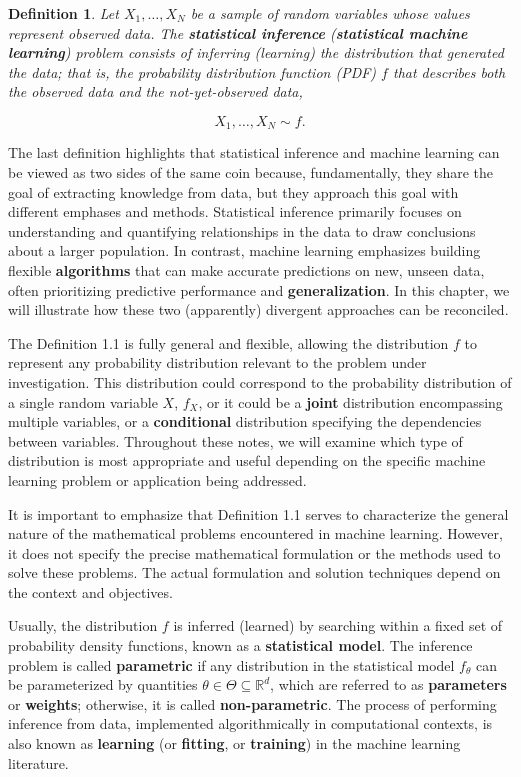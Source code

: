 \documentclass{report}
\newtheorem{definition}{Definition}[chapter]
\begin{document}
\begin{definition}
Let $X_1,\dots,X_N$ be a sample of random variables whose values represent observed data. The \textbf{statistical inference} (\textbf{statistical machine learning}) problem consists of inferring (learning) the distribution that generated the data; that is, the probability distribution function (PDF) $f$ that describes both the observed data and the not-yet-observed data,

\begin{equation*}
X_1,\dots,X_N \sim f.
\end{equation*}

\end{definition}

The last definition highlights that statistical inference and machine learning can be viewed as two sides of the same coin because, fundamentally, they share the goal of extracting knowledge from data, but they approach this goal with different emphases and methods.  Statistical inference primarily focuses on understanding and quantifying relationships in the data to draw conclusions about a larger population. In contrast, machine learning emphasizes building flexible \textbf{algorithms} that can make accurate predictions on new, unseen data, often prioritizing predictive performance and \textbf{generalization}. In this chapter, we will illustrate how these two (apparently) divergent approaches can be reconciled.

The Definition 1.1 is fully general and flexible, allowing the distribution $f$ to represent any probability distribution relevant to the problem under investigation. This distribution could correspond to the probability distribution of a single random variable $X$, $f_X$, or it could be a \textbf{joint} distribution encompassing multiple variables, or a \textbf{conditional} distribution specifying the dependencies between variables. Throughout these notes, we will examine which type of distribution is most appropriate and useful depending on the specific machine learning problem or application being addressed.

It is important to emphasize that Definition 1.1 serves to characterize the general nature of the mathematical problems encountered in machine learning. However, it does not specify the precise mathematical formulation or the methods used to solve these problems. The actual formulation and solution techniques depend on the context and objectives.

Usually, the distribution $f$ is inferred (learned) by searching within a fixed set of probability density functions, known as a \textbf{statistical model}. The inference problem is called \textbf{parametric} if any distribution in the statistical model $f_\theta$ can be parameterized by quantities $\theta \in \Theta \subseteq \mathbb{R}^d$, which are referred to as \textbf{parameters} or \textbf{weights}; otherwise, it is called \textbf{non-parametric}. The process of performing inference from data, implemented algorithmically in computational contexts, is also known as \textbf{learning} (or \textbf{fitting}, or \textbf{training}) in the machine learning literature.
\end{document}
